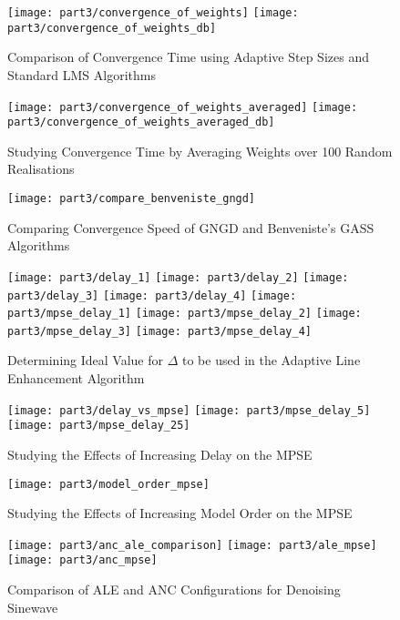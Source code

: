 \begin{figure}[H]
\centering{}
\texttt{[image: part3/convergence\_of\_weights]}
\texttt{[image: part3/convergence\_of\_weights\_db]}
\caption{Comparison of Convergence Time using Adaptive Step Sizes and Standard LMS Algorithms}
\end{figure}


\begin{figure}[H]
\centering{}
\texttt{[image: part3/convergence\_of\_weights\_averaged]}
\texttt{[image: part3/convergence\_of\_weights\_averaged\_db]}
\caption{Studying Convergence Time by Averaging Weights over 100 Random Realisations}
\end{figure}


\begin{figure}[H]
\centering{}
\texttt{[image: part3/compare\_benveniste\_gngd]}
\caption{Comparing Convergence Speed of GNGD and Benveniste's GASS Algorithms}
\end{figure}


\begin{figure}[H]
\centering{}
\texttt{[image: part3/delay\_1]}
\texttt{[image: part3/delay\_2]}
\texttt{[image: part3/delay\_3]}
\texttt{[image: part3/delay\_4]}
\texttt{[image: part3/mpse\_delay\_1]}
\texttt{[image: part3/mpse\_delay\_2]}
\texttt{[image: part3/mpse\_delay\_3]}
\texttt{[image: part3/mpse\_delay\_4]}
\caption{Determining Ideal Value for $\Delta$ to be used in the Adaptive Line Enhancement Algorithm}
\end{figure}

\begin{figure}[H]
\centering{}
\texttt{[image: part3/delay\_vs\_mpse]}
\texttt{[image: part3/mpse\_delay\_5]}
\texttt{[image: part3/mpse\_delay\_25]}
\caption{Studying the Effects of Increasing Delay on the MPSE}
\end{figure}

\begin{figure}[H]
\centering{}
\texttt{[image: part3/model\_order\_mpse]}
\caption{Studying the Effects of Increasing Model Order on the MPSE}
\end{figure}

\begin{figure}[H]
\centering{}
\texttt{[image: part3/anc\_ale\_comparison]}
\texttt{[image: part3/ale\_mpse]}
\texttt{[image: part3/anc\_mpse]}
\caption{Comparison of ALE and ANC Configurations for Denoising Sinewave}
\end{figure}

